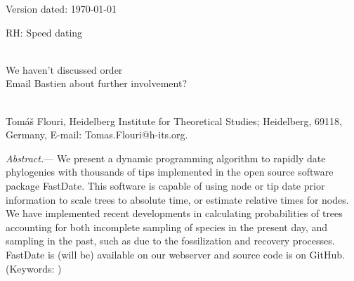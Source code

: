 \documentclass{llncs}
\newcommand{\ejmcomment}[1]{{\color{green} #1}}
\renewcommand{\subsubsection}[1]{%
\vspace{2ex}
\noindent
\textit{#1.}---}
\begin{document}
\begin{flushright}
Version dated: \today
\end{flushright}
\bigskip
\noindent RH: Speed dating


\bigskip
\medskip
\begin{center}

\bigskip




\\
\ejmcomment{We haven't discussed order\\ Email Bastien about further involvement?\\}
\\
\end{center}
\medskip
{} Tom\'{a}\v{s} Flouri, 
Heidelberg Institute for Theoretical Studies; Heidelberg, 69118, Germany, E-mail: Tomas.Flouri@h-its.org.\\


\vspace{1in}

\subsubsection{Abstract} We present a dynamic programming algorithm to rapidly
date phylogenies with thousands of tips implemented in the open source software package FastDate. 
This software is capable of using node or tip date prior information to scale trees to absolute time,
or estimate relative times for nodes.
We have implemented recent developments in calculating probabilities of trees accounting for both incomplete 
sampling of species in the present day, and sampling in the past, 
such as due to the fossilization and recovery processes.
FastDate is \ejmcomment{(will be)} available on our webserver and source code is on GitHub.\\
\noindent (Keywords: )\\
\end{document}
